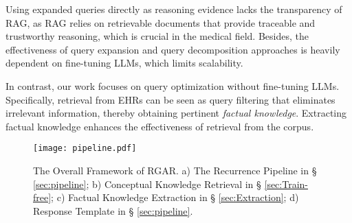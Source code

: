 Using expanded queries directly as reasoning evidence lacks the transparency of RAG, as RAG relies on retrievable documents that provide traceable and trustworthy reasoning, which is crucial in the medical field.
Besides, the effectiveness of query expansion and query decomposition approaches is heavily dependent on fine-tuning LLMs, which limits scalability.


In contrast, our work focuses on query optimization without fine-tuning LLMs. Specifically, retrieval from EHRs can be seen as query filtering that eliminates irrelevant information, thereby obtaining pertinent \textit{factual knowledge}. Extracting factual knowledge enhances the effectiveness of retrieval from the corpus.





\begin{figure*}
    \centering
    \texttt{[image: pipeline.pdf]}
    \caption{The Overall Framework of RGAR. a) The Recurrence Pipeline in § \ref{sec:pipeline}; b) Conceptual Knowledge Retrieval in § \ref{sec:Train-free}; c) Factual Knowledge Extraction in § \ref{sec:Extraction}; d) Response Template in § \ref{sec:pipeline}.}
    \label{fig:pipeline}
\end{figure*}